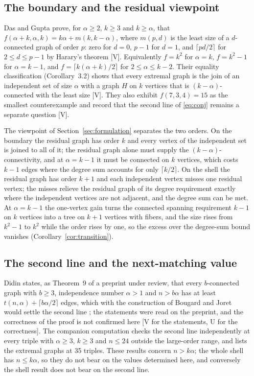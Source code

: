 \subsection{The boundary and the residual viewpoint}\label{sec:rel-dg}

Das and Gupta \cite{DG} prove, for $\alpha\ge2$, $k\ge3$ and $k\ge\alpha$, that $f(\alpha+k,\alpha,k)=k\alpha+m(k,k-\alpha)$, where $m(p,d)$ is the least size of a $d$-connected graph of order $p$: zero for $d=0$, $p-1$ for $d=1$, and $\lceil pd/2\rceil$ for $2\le d\le p-1$ by Harary's theorem [V].
Equivalently $f=k^2$ for $\alpha=k$, $f=k^2-1$ for $\alpha=k-1$, and $f=\lceil k(\alpha+k)/2\rceil$ for $2\le\alpha\le k-2$.
Their equality classification (Corollary~3.2) shows that every extremal graph is the join of an independent set of size $\alpha$ with a graph $H$ on $k$ vertices that is $(k-\alpha)$-connected with the least size [V].
They also exhibit $f(7,3,4)=15$ as the smallest counterexample and record that the second line of \eqref{eq:conj} remains a separate question [V].

The viewpoint of Section~\ref{sec:formulation} separates the two orders.
On the boundary the residual graph has order $k$ and every vertex of the independent set is joined to all of it; the residual graph alone must supply the $(k-\alpha)$-connectivity, and at $\alpha=k-1$ it must be connected on $k$ vertices, which costs $k-1$ edges where the degree sum accounts for only $\lceil k/2\rceil$.
On the shell the residual graph has order $k+1$ and each independent vertex misses one residual vertex; the misses relieve the residual graph of its degree requirement exactly where the independent vertices are not adjacent, and the degree sum can be met.
At $\alpha=k-1$ the one-vertex gain turns the connected spanning requirement $k-1$ on $k$ vertices into a tree on $k+1$ vertices with fibers, and the size rises from $k^2-1$ to $k^2$ while the order rises by one, so the excess over the degree-sum bound vanishes (Corollary~\ref{cor:transition}).

\subsection{The second line and the next-matching value}\label{sec:rel-second}

Didin states, as Theorem~9 of a preprint under review, that every $b$-connected graph with $b\ge3$, independence number $\alpha>1$ and $n>b\alpha$ has at least $t(n,\alpha)+\lceil b\alpha/2\rceil$ edges, which with the construction of Bougard and Joret would settle the second line \cite{Didin,DidinMalyshev}; the statements were read on the preprint, and the correctness of the proof is not confirmed here [V for the statements, U for the correctness].
The companion computation \cite{Second} checks the second line independently at every triple with $\alpha\ge3$, $k\ge3$ and $n\le24$ outside the large-order range, and lists the extremal graphs at 35 triples.
These results concern $n>k\alpha$; the whole shell has $n\le k\alpha$, so they do not bear on the values determined here, and conversely the shell result does not bear on the second line.

